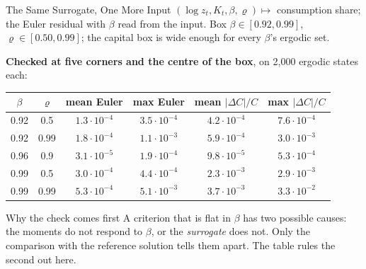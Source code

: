 \documentclass[aspectratio=169,11pt]{beamer}
\begin{document}
\begin{frame}{The Same Surrogate, One More Input}
\small
$(\log z_t, K_t, \beta, \varrho) \mapsto$ consumption share; the Euler residual with $\beta$ read from the input. Box $\beta \in [0.92, 0.99]$, $\varrho \in [0.50, 0.99]$; the capital box is wide enough for every $\beta$'s ergodic set.

\vspace{0.15cm}
\textbf{Checked at five corners and the centre of the box}, on 2{,}000 ergodic states each:
\begin{center}
\footnotesize
\begin{tabular}{cc cc cc}\toprule $\beta$ & $\varrho$ & mean Euler & max Euler & mean $|\Delta C|/C$ & max $|\Delta C|/C$ \\ \midrule 0.92 & 0.5 & $1.3\cdot10^{-4}$ & $3.5\cdot10^{-4}$ & $4.2\cdot10^{-4}$ & $7.6\cdot10^{-4}$ \\ 0.92 & 0.99 & $1.8\cdot10^{-4}$ & $1.1\cdot10^{-3}$ & $5.9\cdot10^{-4}$ & $3.0\cdot10^{-3}$ \\ 0.96 & 0.9 & $3.1\cdot10^{-5}$ & $1.9\cdot10^{-4}$ & $9.8\cdot10^{-5}$ & $5.3\cdot10^{-4}$ \\ 0.99 & 0.5 & $3.0\cdot10^{-4}$ & $4.4\cdot10^{-4}$ & $2.3\cdot10^{-3}$ & $2.9\cdot10^{-3}$ \\ 0.99 & 0.99 & $5.3\cdot10^{-4}$ & $5.1\cdot10^{-3}$ & $3.7\cdot10^{-3}$ & $3.3\cdot10^{-2}$ \\ \bottomrule\end{tabular}
\end{center}

\vspace{0.1cm}
\begin{alertblock}{Why the check comes first}
A criterion that is flat in $\beta$ has two possible causes: the moments do not respond to $\beta$, or the \emph{surrogate} does not. Only the comparison with the reference solution tells them apart. The table rules the second out here.
\end{alertblock}
\end{frame}
\end{document}
